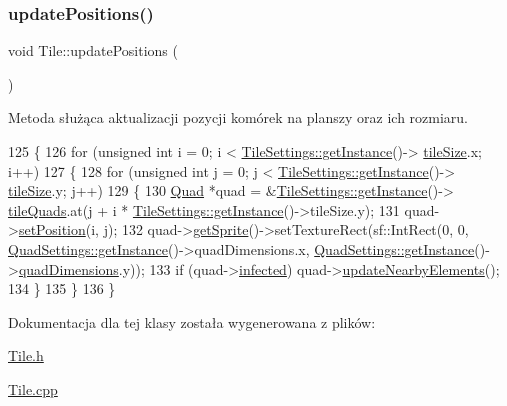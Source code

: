 \subsubsection{\texorpdfstring{update\+Positions()}{updatePositions()}}
{\footnotesize\ttfamily void Tile\+::update\+Positions (\begin{DoxyParamCaption}{ }\end{DoxyParamCaption})\hspace{0.3cm}{\ttfamily [private]}}

Metoda służąca aktualizacji pozycji komórek na planszy oraz ich rozmiaru. 
\begin{DoxyCode}
125 \{
126     \textcolor{keywordflow}{for} (\textcolor{keywordtype}{unsigned} \textcolor{keywordtype}{int} i = 0; i < \mbox{\hyperlink{class_tile_settings_a003ae6e78b97855c8592b2b4c0818914}{TileSettings::getInstance}}()->
      \mbox{\hyperlink{class_tile_settings_ae4be54be3619d21d536ce13b7354f165}{tileSize}}.x; i++)
127     \{
128         \textcolor{keywordflow}{for} (\textcolor{keywordtype}{unsigned} \textcolor{keywordtype}{int} j = 0; j < \mbox{\hyperlink{class_tile_settings_a003ae6e78b97855c8592b2b4c0818914}{TileSettings::getInstance}}()->
      \mbox{\hyperlink{class_tile_settings_ae4be54be3619d21d536ce13b7354f165}{tileSize}}.y; j++)
129         \{
130             \mbox{\hyperlink{class_quad}{Quad}} *quad = &\mbox{\hyperlink{class_tile_settings_a003ae6e78b97855c8592b2b4c0818914}{TileSettings::getInstance}}()->
      \mbox{\hyperlink{class_tile_settings_ac37d7b95a1e2266d38de0a70a907efb3}{tileQuads}}.at(j + i * \mbox{\hyperlink{class_tile_settings_a003ae6e78b97855c8592b2b4c0818914}{TileSettings::getInstance}}()->tileSize.y);
131             quad->\mbox{\hyperlink{class_quad_a1f3970e8f264eabe131e20af7017f940}{setPosition}}(i, j);
132             quad->\mbox{\hyperlink{class_quad_a35f20e65dd33bb5864f73575b04896e7}{getSprite}}()->setTextureRect(sf::IntRect(0, 0, 
      \mbox{\hyperlink{class_quad_settings_a20d7cfd0c56c11adcdf75c5e3011de67}{QuadSettings::getInstance}}()->quadDimensions.x, 
      \mbox{\hyperlink{class_quad_settings_a20d7cfd0c56c11adcdf75c5e3011de67}{QuadSettings::getInstance}}()->\mbox{\hyperlink{class_quad_settings_abb4a967873d7a93098ef168b894280d6}{quadDimensions}}.y));
133             \textcolor{keywordflow}{if} (quad->\mbox{\hyperlink{class_quad_ae439ca631a9f51147b9d84a9c9df49c4}{infected}}) quad->\mbox{\hyperlink{class_quad_a67483d3d113d177c0820f586a923e65e}{updateNearbyElements}}();
134         \}
135     \}
136 \}
\end{DoxyCode}


Dokumentacja dla tej klasy została wygenerowana z plików\+:\begin{DoxyCompactItemize}
\item 
\mbox{\hyperlink{_tile_8h}{Tile.\+h}}\item 
\mbox{\hyperlink{_tile_8cpp}{Tile.\+cpp}}\end{DoxyCompactItemize}
